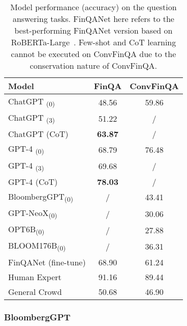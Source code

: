 \begin{table}[!h]
	\centering
	\begin{tabularx}{0.8\textwidth}{Xcc}
		\toprule
		\textbf{Model}                  & \textbf{FinQA} & \textbf{ConvFinQA} \\
		\midrule
		ChatGPT \textsubscript{(0)}     & 48.56          & 59.86              \\
		ChatGPT \textsubscript{(3)}     & 51.22          & /                  \\
		ChatGPT (CoT)                   & \textbf{63.87} & /                  \\
		GPT-4 \textsubscript{(0)}       & 68.79          & 76.48              \\
		GPT-4 \textsubscript{(3)}       & 69.68          & /                  \\
		GPT-4 (CoT)                     & \textbf{78.03} & /                  \\
		BloombergGPT\textsubscript{(0)} & /              & 43.41              \\
		GPT-NeoX\textsubscript{(0)}     & /              & 30.06              \\
		OPT6B\textsubscript{(0)}        & /              & 27.88              \\
		BLOOM176B\textsubscript{(0)}    & /              & 36.31              \\
		FinQANet (fine-tune)            & 68.90          & 61.24              \\
		Human Expert                    & 91.16          & 89.44              \\
		General Crowd                   & 50.68          & 46.90              \\
		\bottomrule
	\end{tabularx}
	\caption{Model performance (accuracy) on the question answering tasks. FinQANet here refers to the best-performing FinQANet version based on RoBERTa-Large~\cite{chen2022afinqa}. Few-shot and CoT learning cannot be executed on ConvFinQA due to the conservation nature of ConvFinQA.}
	\label{tab:model_performance_qa}
\end{table}

\subsubsection{BloombergGPT}
\label{subsubsec:bloomberggpt}

